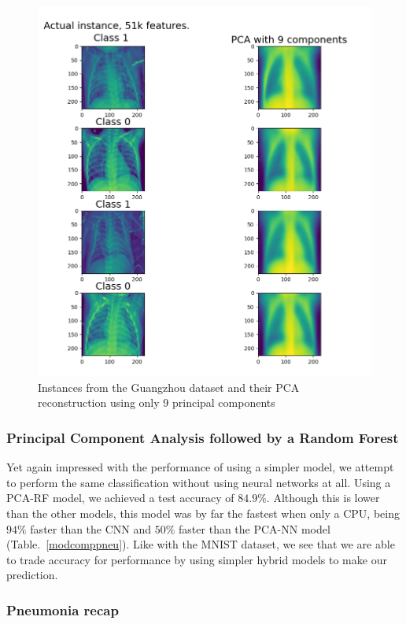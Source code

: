 \documentclass[onecolumn,10pt,cleanfoot]{asme2ej}
\begin{document}
\begin{figure}[H]
\centerline{\includegraphics[width=6in]{figure/pneupcacomp.png}}
\caption{Instances from the Guangzhou dataset and their PCA reconstruction using only 9 principal components}
\label{pneupcacomp}
\end{figure}

\subsubsection{Principal Component Analysis followed by a Random Forest}

Yet again impressed with the performance of using a simpler model, we attempt to perform the same classification without using neural networks at all. Using a PCA-RF model, we achieved a test accuracy of $84.9\%$. Although this is lower than the other models, this model was by far the fastest when only a CPU, being $94\%$ faster than the CNN and $50\%$ faster than the PCA-NN model (Table.~\ref{modcomppneu}). Like with the MNIST dataset, we see that we are able to trade accuracy for performance by using simpler hybrid models to make our prediction.

\subsubsection{Pneumonia recap}
\end{document}
